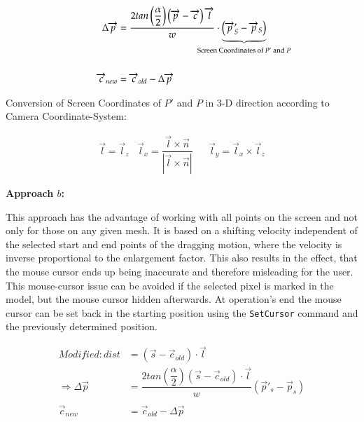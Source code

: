 \begin{align*}  \Delta\overrightarrow{p} &= \dfrac{2tan\left(\dfrac{\alpha}{2}\right)\left(\overrightarrow{p} - \overrightarrow{c}\right) \overrightarrow{l}}{w} \cdot \underbrace{\left(\overrightarrow{p}'_{S} - \overrightarrow{p}_{S}\right)}_{ 
		\mathclap{\text{Screen Coordinates of $P'$ and $P$}}} \\                                                                                                                                                                                      \\ 
	\overrightarrow{c}_{new} &= \overrightarrow{c}_{old} -\Delta\overrightarrow{p}                                                                                                                                                                      
\end{align*}

Conversion of Screen Coordinates of $P'$ and $P$ in 3-D direction according to Camera Coordinate-System:

\begin{align*}
	& \overrightarrow{l} = \overrightarrow{l}_{z} & \overrightarrow{l}_{x} = \dfrac{\overrightarrow{l} \times \overrightarrow{n}}{|\overrightarrow{l}\times \overrightarrow{n}|} &   & \overrightarrow{l}_{y} = \overrightarrow{l}_{x} \times \overrightarrow{l}_{z} &   
\end{align*}

\noindent\textbf{Approach $b$:} \newline

This approach has the advantage of working with all points on the screen and not only for those on any given \gls{mesh}. It is based on a shifting velocity independent of the selected start and end points of the dragging motion, where the velocity is inverse proportional to the enlargement factor. 
This also results in the effect, that the mouse cursor ends up being inaccurate and therefore misleading for the user. This mouse-cursor issue can be avoided if the selected pixel is marked in the model, but the mouse cursor hidden afterwards. At operation's end the mouse cursor can be set back in the starting position using the \verb|SetCursor| command and the previously determined position. \newline


\begin{align*} 
	Modified:  dist &= \left( \overrightarrow{s} - \overrightarrow{c}_{old}\right) \cdot \overrightarrow{l} \\
	\Rightarrow \Delta\overrightarrow{p} &= \dfrac{2tan\left(\dfrac{\alpha}{2}\right)\left(\overrightarrow{s} - \overrightarrow{c}_{old}\right) \cdot \overrightarrow{l}}{w} \left(\overrightarrow{p}'_{s} - \overrightarrow{p}_{s} \right)  \\
	\\
	\overrightarrow{c}_{new} &= \overrightarrow{c}_{old} - \Delta \overrightarrow{p}
\end{align*}

